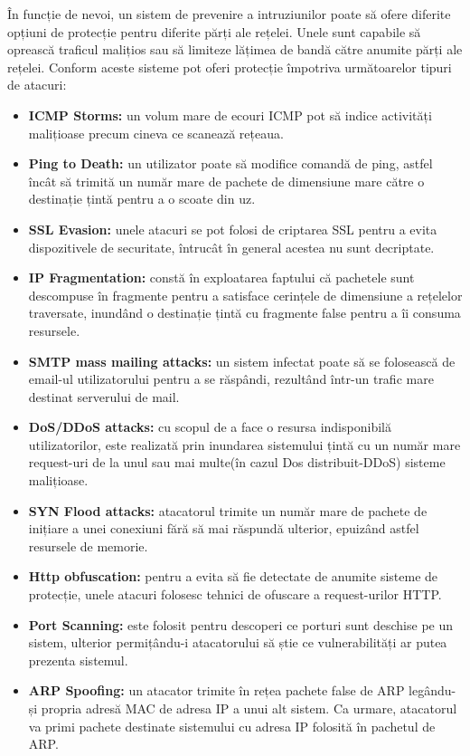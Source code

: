 În funcție de nevoi, un sistem de prevenire a intruziunilor poate să ofere diferite opțiuni de protecție pentru diferite părți ale rețelei. Unele sunt capabile să oprească traficul malițios sau să limiteze lățimea de bandă către anumite părți ale rețelei. Conform \cite{ips_sec_types} aceste sisteme pot oferi protecție împotriva următoarelor tipuri de atacuri: 
\begin{itemize}
	\item \textbf{ICMP Storms:}  un volum mare de ecouri ICMP pot să indice activități malițioase precum cineva ce scanează rețeaua. 
	\item \textbf{Ping to Death:}  un utilizator poate să modifice comandă de ping, astfel încât să trimită un număr mare de pachete de dimensiune mare către o destinație țintă pentru a o scoate din uz. 
	\item \textbf{SSL Evasion:}  unele atacuri se pot folosi de criptarea SSL pentru a evita dispozitivele de securitate, întrucât în general acestea nu sunt decriptate. 
	\item \textbf{IP Fragmentation:}  constă în exploatarea faptului că pachetele sunt descompuse în fragmente pentru a satisface cerințele de dimensiune a rețelelor traversate, inundând o destinație țintă cu fragmente false pentru a îi consuma resursele.  
	\item \textbf{SMTP mass mailing attacks:}  un sistem infectat poate să se folosească de email-ul utilizatorului pentru a se răspândi, rezultând într-un trafic mare destinat serverului de mail. 
	\item \textbf{DoS/DDoS attacks:} cu scopul de a face o resursa indisponibilă utilizatorilor, este realizată prin inundarea sistemului țintă cu un număr mare request-uri de la unul sau mai multe(în cazul Dos distribuit-DDoS) sisteme malițioase. 
	\item \textbf{SYN Flood attacks:}  atacatorul trimite un număr mare de pachete de inițiare a unei conexiuni fără să mai răspundă ulterior, epuizând astfel resursele de memorie. 
	\item \textbf{Http obfuscation:}  pentru a evita să fie detectate de anumite sisteme de protecție, unele atacuri folosesc tehnici de ofuscare a request-urilor HTTP. 
	\item \textbf{Port Scanning:}  este folosit pentru descoperi ce porturi sunt deschise pe un sistem, ulterior permițându-i atacatorului să știe ce vulnerabilități ar putea prezenta sistemul. 
	\item \textbf{ARP Spoofing:}  un atacator trimite în rețea pachete false de ARP legându-și propria adresă MAC de adresa IP a unui alt sistem. Ca urmare, atacatorul va primi pachete destinate sistemului cu adresa IP folosită în pachetul de ARP. 

\end{itemize}
